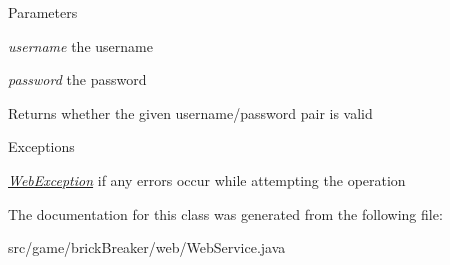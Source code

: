 \begin{DoxyParams}{Parameters}
\item[{\em username}]the username \item[{\em password}]the password \end{DoxyParams}
\begin{DoxyReturn}{Returns}
whether the given username/password pair is valid
\end{DoxyReturn}

\begin{DoxyExceptions}{Exceptions}
\item[{\em \hyperlink{classbrick_breaker_1_1web_1_1_web_exception}{WebException}}]if any errors occur while attempting the operation \end{DoxyExceptions}


The documentation for this class was generated from the following file:\begin{DoxyCompactItemize}
\item 
src/game/brickBreaker/web/WebService.java\end{DoxyCompactItemize}
